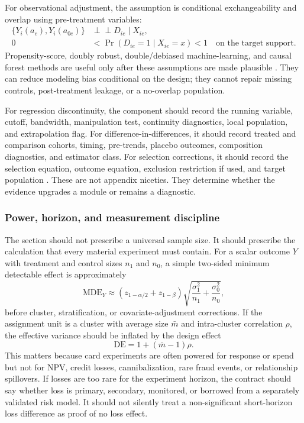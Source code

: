 \documentclass[11pt]{article}
\newcommand{\1}{\mathbf{1}}
\begin{document}
For observational adjustment, the assumption is conditional exchangeability
and overlap using pre-treatment variables:
\begin{align}
  \{Y_i(a_e),Y_i(a_{0e})\} &\perp\!\!\!\perp D_{ie}\mid X_{ie}, \\
  0 &< \Pr(D_{ie}=1\mid X_{ie}=x) < 1
      \quad \text{on the target support}.
      \label{eq:overlap-assumption}
\end{align}
Propensity-score, doubly robust, double/debiased machine-learning, and causal
forest methods are useful only after these assumptions are made plausible
\citep{rosenbaum1983propensity,imbenswooldridge2009recent,
chernozhukov2018dml,wager2018causalforests}. They can reduce modeling bias
conditional on the design; they cannot repair missing controls, post-treatment
leakage, or a no-overlap population.

For regression discontinuity, the component should record the running
variable, cutoff, bandwidth, manipulation test, continuity diagnostics, local
population, and extrapolation flag. For difference-in-differences, it should
record treated and comparison cohorts, timing, pre-trends, placebo outcomes,
composition diagnostics, and estimator class. For selection corrections, it
should record the selection equation, outcome equation, exclusion restriction
if used, and target population \citep{heckman1979selection}. These are not
appendix niceties. They determine whether the evidence upgrades a module or
remains a diagnostic.

\subsubsection{Power, horizon, and measurement discipline}

The section should not prescribe a universal sample size. It should prescribe
the calculation that every material experiment must contain. For a scalar
outcome $Y$ with treatment and control sizes $n_1$ and $n_0$, a simple
two-sided minimum detectable effect is approximately
\begin{equation}
  \mathrm{MDE}_Y
  \approx
  (z_{1-\alpha/2}+z_{1-\beta})
  \sqrt{\frac{\sigma_1^2}{n_1}+\frac{\sigma_0^2}{n_0}},
  \label{eq:mde}
\end{equation}
before cluster, stratification, or covariate-adjustment corrections. If the
assignment unit is a cluster with average size $\bar{m}$ and intra-cluster
correlation $\rho$, the effective variance should be inflated by the design
effect
\begin{equation}
  \mathrm{DE}=1+(\bar{m}-1)\rho.
  \label{eq:design-effect}
\end{equation}
This matters because card experiments are often powered for response or spend
but not for NPV, credit losses, cannibalization, rare fraud events, or
relationship spillovers. If losses are too rare for the experiment horizon,
the contract should say whether loss is primary, secondary, monitored, or
borrowed from a separately validated risk model. It should not silently treat a
non-significant short-horizon loss difference as proof of no loss effect.
\end{document}
